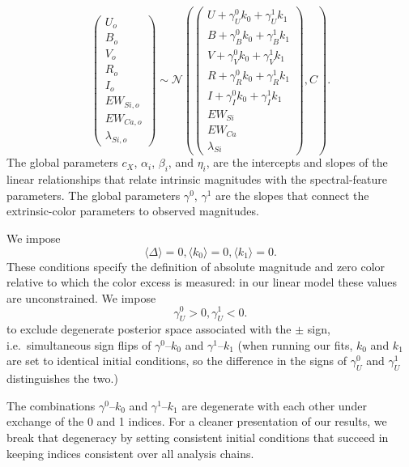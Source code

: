 \documentclass{aastex61}   	%
\begin{document}
\begin{equation}
\begin{pmatrix}
U_o\\B_o\\ V_o\\R_o\\I_o\\EW_{Si, o}\\ EW_{Ca, o} \\ \lambda_{Si, o}
\end{pmatrix}
\sim \mathcal{N}
\left(
\begin{pmatrix}
U +\gamma^0_{U} k_0 +\gamma^1_{U} k_1 \\B +\gamma^0_{B} k_0 +\gamma^1_{B} k_1 \\
V+\gamma^0_{V} k_0+\gamma^1_{V} k_1\\R+\gamma^0_{R} k_0 + \gamma^1_{R} k_1\\I+\gamma^0_{I} k_0+\gamma^1_{I} k_1\\
EW_{Si}\\ EW_{Ca} \\ \lambda_{Si}
\end{pmatrix}
,C
\right).
\label{dust:eqn}
\end{equation}
The global parameters $c_X$, $\alpha_i$, $\beta_i$,  and $\eta_i$,  are the intercepts and slopes of the linear relationships that
relate intrinsic magnitudes with the spectral-feature parameters.
The global parameters $\gamma^0$, $\gamma^1$  are the slopes that connect the extrinsic-color
parameters to observed magnitudes.

\color{purple}
We impose
\begin{equation}
\langle \Delta \rangle=0, \langle k_0 \rangle=0, \langle k_1 \rangle=0.
\end{equation}
These conditions specify the definition of absolute magnitude and zero color relative to which the color excess is measured:
in our linear model these values are unconstrained.
\color{purple}
We impose 
\begin{equation}
\gamma^0_U > 0, \gamma^1_U < 0.
\end{equation}
to exclude degenerate posterior space
associated
with the $\pm$ sign, i.e.\ simultaneous sign flips of
$\gamma^0$--$k_0$ and $\gamma^1$--$k_1$
(when running our fits, $k_0$ and $k_1$ are set to
identical initial conditions, so the difference in the signs of $\gamma^0_U$ and $\gamma^1_U$ distinguishes the two.)

The combinations $\gamma^0$--$k_0$ and $\gamma^1$--$k_1$ are degenerate with
each other under exchange of the 0 and 1 indices. For a cleaner presentation of our results, 
we break that degeneracy  by setting consistent initial conditions that succeed in keeping indices consistent over all analysis chains.  
\color{black}
\end{document}
